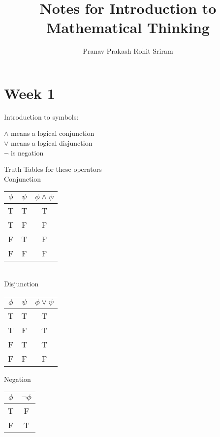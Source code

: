 \documentclass[]{article}
\begin{document}
\title{Notes for Introduction to Mathematical Thinking}
\author{Pranav Prakash \cr Rohit Sriram}
\maketitle

\section{Week 1}

Introduction to symbols:

\begin{center}

\begin{framed}
	$\wedge$ means a logical conjunction \\
 	$\vee$ means a logical disjunction \\
 	$\neg$ is negation
\end{framed}

Truth Tables for these operators \\
\bigskip
\bigskip
Conjunction \\
\bigskip

\begin{tabular}{c c | c}
$\phi$ & $\psi$ & $\phi \wedge \psi$ \\ \hline
T & T & T \\
T & F & F \\
F & T & F \\
F & F & F
\end{tabular} \\

\bigskip
\bigskip
Disjunction \\
\bigskip

\begin{tabular}{c c | c}
$\phi$ & $\psi$ & $\phi \vee \psi$ \\ \hline
T & T & T \\
T & F & T \\
F & T & T \\
F & F & F
\end{tabular}

\bigskip
\bigskip
Negation \\
\bigskip

\begin{tabular}{c | c}
$\phi$ & $\neg \phi$ \\ \hline
T & F \\
F & T
\end{tabular}


\end{center}
\end{document}
